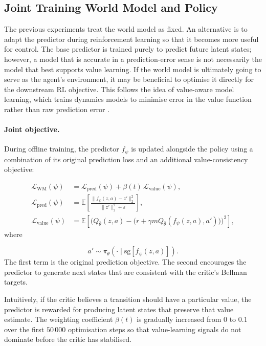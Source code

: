 
\subsection{Joint Training World Model and Policy}
\label{sec:wmep-exp3}

The previous experiments treat the world model as fixed. An
alternative is to adapt the predictor during reinforcement learning so
that it becomes more useful for control.
The base predictor is trained purely to predict
future latent states; however, a model that is accurate in a
prediction-error sense is not necessarily the model that best supports
value learning. If the world model is ultimately going to serve as the
agent's environment, it may be beneficial to optimise it directly for
the downstream RL objective. This follows the idea of value-aware
model learning, which trains dynamics models to minimise error in the
value function rather than raw prediction error
\cite{farahmand2017value}.

\paragraph{Joint objective.}

During offline training, the predictor $f_\psi$ is updated alongside
the policy using a combination of its original prediction loss and an
additional value-consistency objective:

\begin{align}
\mathcal L_{\mathrm{WM}}(\psi)
&=
\mathcal L_{\mathrm{pred}}(\psi)
+
\beta(t)\,
\mathcal L_{\mathrm{value}}(\psi),
\label{eq:wmep-joint}
\\
\mathcal L_{\mathrm{pred}}(\psi)
&=
\mathbb E\!\left[
\frac{\|f_\psi(z,a)-z'\|_2^2}
{\|z'\|_2^2+\varepsilon}
\right],
\label{eq:wmep-pred}
\\
\mathcal L_{\mathrm{value}}(\psi)
&=
\mathbb E\!\left[
\Big(
Q_{\bar\theta}(z,a)
-
\big(
r+\gamma m
Q_{\bar\theta}(f_\psi(z,a),a')
\big)
\Big)^2
\right],
\label{eq:wmep-value}
\end{align}
where

\[
a'
\sim
\pi_\theta\!\left(
\cdot
\mid
\mathrm{sg}[f_\psi(z,a)]
\right).
\]
The first term is the original prediction objective. The second
encourages the predictor to generate next states that are consistent
with the critic's Bellman targets.

Intuitively, if the critic believes a transition should have a
particular value, the predictor is rewarded for producing latent states
that preserve that value estimate. The weighting coefficient
$\beta(t)$ is gradually increased from $0$ to $0.1$ over the first
$50\,000$ optimisation steps so that value-learning signals do not
dominate before the critic has stabilised.

